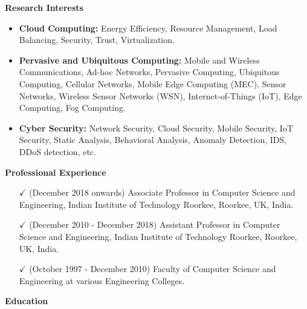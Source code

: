 \documentclass [a4paper,12pt]{article}
\begin{document}
\begin{flushleft}

\textbf{\textcolor[rgb]{0.00,0.00,1.00}{Research Interests}}
\end{flushleft}
\begin{itemize}
 
\item \textbf{Cloud Computing:} Energy Efficiency, Resource Management, Load Balancing, Security, Trust, Virtualization.
\item \textbf{Pervasive and Ubiquitous Computing:} Mobile and Wireless Communications, Ad-hoc Networks, Pervasive Computing, Ubiquitous Computing, Cellular Networks, Mobile Edge Computing (MEC), Sensor Networks, Wireless Sensor Networks (WSN), Internet-of-Things (IoT), Edge Computing, Fog Computing.
\item \textbf{Cyber Security:} Network Security, Cloud Security, Mobile Security, IoT Security, Static Analysis, Behavioral Analysis, Anomaly Detection, IDS, DDoS detection, etc.

\end{itemize}

\begin{flushleft} 
\textbf{\textcolor[rgb]{0.00,0.00,1.00}{Professional Experience}}
\end{flushleft}
 
\vspace{-0.3cm}
\begin{itemize}

\item[$\checkmark$] (December 2018 onwards) Associate Professor in Computer Science and Engineering, Indian Institute of Technology Roorkee, Roorkee, UK, India.
\item[$\checkmark$] (December 2010 - December 2018) Assistant Professor in Computer Science and Engineering, Indian Institute of Technology Roorkee, Roorkee, UK, India.
\item [$\checkmark$] (October 1997 - December 2010) Faculty of Computer Science and Engineering at various Engineering Colleges. 

\end{itemize}



\begin{flushleft} 
\textbf{\textcolor[rgb]{0.00,0.00,1.00}{Education}}
\end{flushleft}
 
\end{document}
